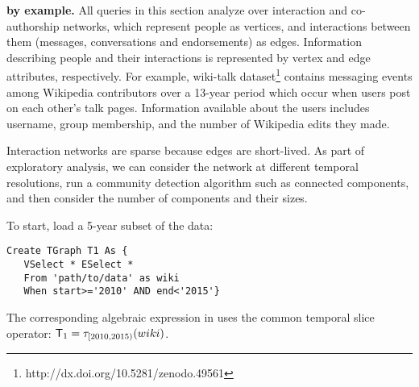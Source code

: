 {\bf \ql by example.}  All queries in this section analyze over
interaction and co-authorship networks, which represent people as
vertices, and interactions between them (messages, conversations and
endorsements) as edges.  Information describing people and their
interactions is represented by vertex and edge attributes,
respectively. For example, wiki-talk
dataset\footnote{http://dx.doi.org/10.5281/zenodo.49561} contains
messaging events among Wikipedia contributors over a 13-year period
which occur when users post on each other's talk pages.  Information
available about the users includes username, group membership, and the
number of Wikipedia edits they made.

Interaction networks are sparse because edges are short-lived.  As
part of exploratory analysis, we can consider the network at different
temporal resolutions, run a community detection algorithm such as
connected components, and then consider the number of
components and their sizes.




\begin{example}
\vspace{-0.1cm}
\label{ex:slice}
To start, load a 5-year subset of the data:
\begin{small}
\begin{verbatim}
Create TGraph T1 As {
   VSelect * ESelect *  
   From 'path/to/data' as wiki
   When start>='2010' AND end<'2015'}
\end{verbatim}
\vspace{-0.1cm}
\end{small}

The corresponding algebraic expression in \tga uses the common
temporal slice operator: $\mathsf{T}_1 = \tau_{[2010, 2015)}(wiki)$.

\vspace{-0.1cm}
\end{example}

